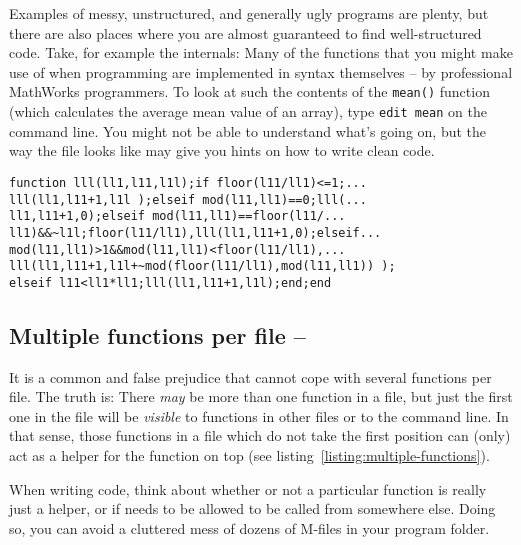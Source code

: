 Examples of messy, unstructured, and generally ugly programs are plenty, but
there are also places where you are almost guaranteed to find well-structured
code. Take, for example the \matlab{} internals: Many of the functions that
you might make use of when programming \matlab{} are implemented in \matlab{}
syntax themselves -- by professional MathWorks programmers. To look at such
the contents of the \lstinline!mean()! function (which calculates the average
mean value of an array), type \lstinline!edit mean! on the \matlab{} command
line. You might not be able to understand what's going on, but the way the
file looks like may give you hints on how to write clean code.


\begin{lstlisting}[framerule=2pt,rulecolor=\color{badred},float=b,label={listing:prime1},caption={Perfectly legal \matlab{} code, with all rules of style ignored. Can you guess what this function does?}]
function lll(ll1,l11,l1l);if floor(l11/ll1)<=1;...
lll(ll1,l11+1,l1l );elseif mod(l11,ll1)==0;lll(...
ll1,l11+1,0);elseif mod(l11,ll1)==floor(l11/...
ll1)&&~l1l;floor(l11/ll1),lll(ll1,l11+1,0);elseif...
mod(l11,ll1)>1&&mod(l11,ll1)<floor(l11/ll1),...
lll(ll1,l11+1,l1l+~mod(floor(l11/ll1),mod(l11,ll1)) );
elseif l11<ll1*ll1;lll(ll1,l11+1,l1l);end;end
\end{lstlisting}

\subsection{Multiple functions per file  -- \cleansymbol\cleansymbol\cleansymbol}
It is a common and false prejudice that \matlab{} cannot cope with several
functions per file. The truth is: There \emph{may} be more than one function
in a file, but just the first one in the file will be \emph{visible} to
functions in other files or to the command line. In that sense, those
functions in a file which do not take the first position can (only) act as a
helper for the function on top (see listing~\ref{listing:multiple-functions}).

When writing code, think about whether or not a particular function is really
just a helper, or if needs to be allowed to be called from somewhere else.
Doing so, you can avoid a cluttered mess of dozens of M-files in your program
folder.

